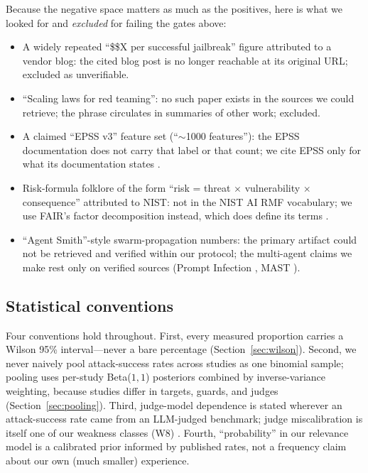 Because the negative space matters as much as the positives, here is what we
looked for and \emph{excluded} for failing the gates above:

\begin{itemize}[itemsep=2pt, topsep=4pt]
  \item A widely repeated ``\$\$X per successful jailbreak'' figure attributed to a
        vendor blog: the cited blog post is no longer reachable at its original
        URL; excluded as unverifiable.
  \item ``Scaling laws for red teaming'': no such paper exists in the sources we
        could retrieve; the phrase circulates in summaries of other work; excluded.
  \item A claimed ``EPSS v3'' feature set (``$\sim$1000 features''): the EPSS
        documentation does not carry that label or that count; we cite EPSS only
        for what its documentation states \cite{epss-first,epss-paper}.
  \item Risk-formula folklore of the form ``risk = threat $\times$ vulnerability
        $\times$ consequence'' attributed to NIST: not in the NIST AI RMF
        vocabulary; we use FAIR's factor decomposition instead, which does define
        its terms \cite{fair}.
  \item ``Agent Smith''-style swarm-propagation numbers: the primary artifact could
        not be retrieved and verified within our protocol; the multi-agent claims
        we make rest only on verified sources (Prompt Infection \cite{promptinfection},
        MAST \cite{mast}).
\end{itemize}

\subsection{Statistical conventions}

Four conventions hold throughout. First, every measured proportion carries a Wilson
95\% interval---never a bare percentage (Section~\ref{sec:wilson}). Second, we
never naively pool attack-success rates across studies as one binomial sample;
pooling uses per-study Beta($1,1$) posteriors combined by inverse-variance
weighting, because studies differ in targets, guards, and judges
(Section~\ref{sec:pooling}). Third, judge-model dependence is stated wherever an
attack-success rate came from an LLM-judged benchmark; judge miscalibration is
itself one of our weakness classes (W8) \cite{judgesurvey,judgecalib}. Fourth,
``probability'' in our relevance model is a calibrated prior informed by published
rates, not a frequency claim about our own (much smaller) experience.

